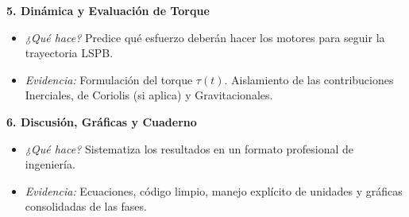 \documentclass[11pt, a4paper]{article}
\begin{document}
\textbf{5. Dinámica y Evaluación de Torque}
\begin{itemize}
    \item \textit{¿Qué hace?} Predice qué esfuerzo deberán hacer los motores para seguir la trayectoria LSPB.
    \item \textit{Evidencia:} Formulación del torque $\tau(t)$. Aislamiento de las contribuciones Inerciales, de Coriolis (si aplica) y Gravitacionales.
\end{itemize}

\textbf{6. Discusión, Gráficas y Cuaderno}
\begin{itemize}
    \item \textit{¿Qué hace?} Sistematiza los resultados en un formato profesional de ingeniería.
    \item \textit{Evidencia:} Ecuaciones, código limpio, manejo explícito de unidades y gráficas consolidadas de las fases.
\end{itemize}
\end{document}
